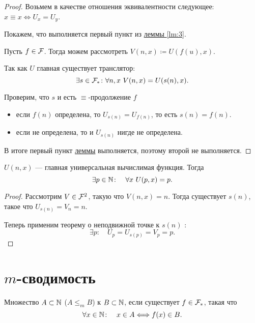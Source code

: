 \begin{proof}
    Возьмем в качестве отношения эквивалентности следующее: $ x \equiv x \Longleftrightarrow U_x = U_y $.

	Покажем, что выполняется первый пункт из \hyperref[lm:3]{леммы \ref{lm:3}}.

	Пусть $ f \in \mathcal{F}$. Тогда можем рассмотреть $ V(n, x) \coloneqq U(f(u), x)$. 

	Так как $ U$ главная существует транслятор:
	\[
		\exists s \in \mathcal{F}_{*} \colon  \forall n, x ~V(n, x) = U(s(n), x)
	.\] 

	Проверим, что $ s $ и есть $ \equiv $-продолжение $ f$
	\begin{itemize}
	\item если $ f(n)$ определена, то $ U_{s(n)} = U_{f(n)}$, то есть $ s(n) = f(n)$.
		\item если не определена, то и $ U_{s(n)}$ нигде не определена.
	\end{itemize}

	В итоге первый пункт \hyperref[lm:3]{леммы} выполняется, поэтому второй не выполняется.
\end{proof}
\begin{cor}
	$ U(n, x)$ --- главная универсальная вычислимая функция. Тогда 
	\[
		\exists p \in \mathbb{N} \colon \quad \forall x  ~ U(p, x) = p
	.\] 
\end{cor}
\begin{proof}
	Рассмотрим $ V \in \mathcal{F}^{2}$, такую что $ V(n, x) = n$.
	Тогда существует $ s(n)$, такое что  $ U_{s(n)} = V_n = n$.

	Теперь применим теорему о неподвижной точке к  $ s(n)$ : 
	\[
		\exists p \colon \quad U_p = U_{s(p)} = V_p = p
	.\] 
\end{proof}

\section{$ m$-сводимость}
\begin{defn}[$ m$-сводимость]
	Множество $ A \subset \mathbb{N}$   ($ A \le_{m} B$) к $ B \subset \mathbb{N}$, если существует $ f \in \mathcal{F}_{*}$, такая что
	\[
		\forall x \in \mathbb{N} \colon\quad x \in A \Longleftrightarrow f(x) \in B
	.\] 
\end{defn}


